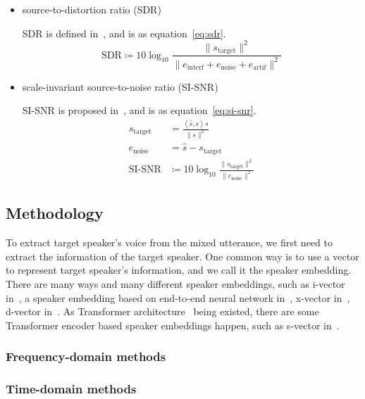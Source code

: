 \begin{itemize}
    \item source-to-distortion ratio (SDR)

    SDR is defined in~\cite{performance_measurement}, and is as equation~\ref{eq:sdr}.
    \begin{equation}
        \text{SDR} \coloneqq 10\log_{10}\frac{\| s_{\text{target}} \|^2}{\| e_{\text{interf}} + e_{\text{noise}} + e_{\text{artif}} \|^2}
        \label{eq:sdr}
    \end{equation}

    \item scale-invariant source-to-noise ratio (SI-SNR)

    SI-SNR is proposed in~\cite{tasnet}, and is as equation~\ref{eq:si-snr}.
    \begin{equation}
        \begin{aligned}
            s_{\text{target}} &= \frac{\left< \hat{s}, s \right>s}{\| s \|^2} \\
            e_{\text{noise}} &= \hat{s} - s_{\text{target}} \\
            \text{SI-SNR} &\coloneqq 10\log_{10}\frac{\| s_{\text{target}} \|^2}{\| e_{\text{noise}} \|^2}
        \end{aligned}\label{eq:si-snr}
    \end{equation}
\end{itemize}

\subsection{Methodology}\label{subsec:methodology}

To extract target speaker's voice from the mixed utterance, we first need to extract the information of the target speaker.
One common way is to use a vector to represent target speaker's information, and we call it the speaker embedding.
There are many ways and many different speaker embeddings, such as i-vector in~\cite{i-vector}, a speaker embedding based on end-to-end neural network in~\cite{deep_speaker}, x-vector in~\cite{x-vector}, d-vector in~\cite{d-vector}.
As Transformer architecture~\cite{attention} being existed, there are some Transformer encoder based speaker embeddings happen, such as s-vector in~\cite{s-vector}.

\subsubsection{Frequency-domain methods}

\subsubsection{Time-domain methods}
